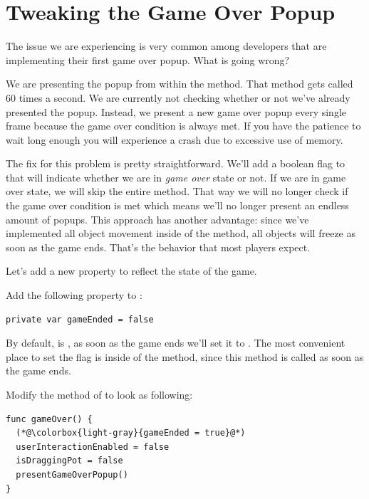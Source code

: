 \section{Tweaking the Game Over Popup}
The issue we are experiencing is very common among developers that are
implementing their first game over popup. What is going wrong?

We are presenting the popup from within the  method. That
method gets called 60 times a second. We are currently not checking whether or not we've already presented the popup. 
Instead, we present a new game over popup every single frame because the game
over condition is always met. If you have the
patience to wait long enough you will experience a crash due to excessive use of
memory.

The fix for this problem is pretty straightforward. We'll add a boolean flag to
 that will indicate whether we are in \textit{game over}
state or not. If we are in game over state, we will skip the entire
 method. That way we will no longer check if the game over
condition is met which means we'll no longer present an endless amount of
popups. This approach has another advantage: since we've implemented all object
movement inside of the  method, all objects will freeze as
soon as the game ends. That's the behavior that most players expect. 

Let's add a new property to reflect the state of the game.

\begin{leftbar}
Add the following property to :
\begin{lstlisting}
private var gameEnded = false
\end{lstlisting}
\end{leftbar}

By default,  is , as soon as the game
ends we'll set it to . The most convenient place to set the
flag is inside of the  method, since this method is called
as soon as the game ends.

\begin{leftbar}
Modify the  method of  to look as
following:
\begin{lstlisting}
func gameOver() {
  (*@\colorbox{light-gray}{gameEnded = true}@*)
  userInteractionEnabled = false
  isDraggingPot = false
  presentGameOverPopup()
}
\end{lstlisting}
\end{leftbar}

